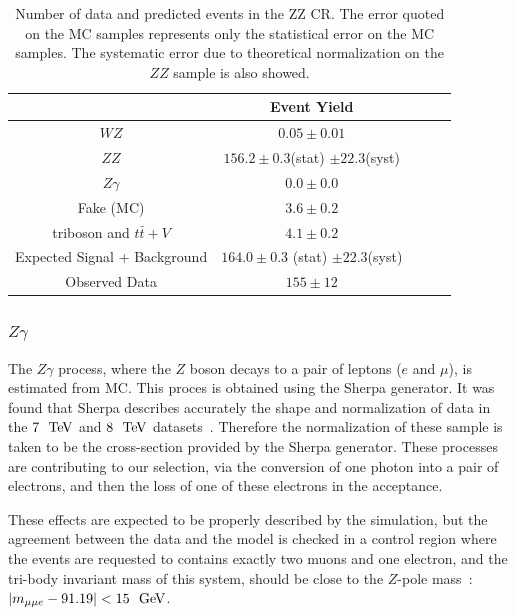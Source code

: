 \begin{table}[htp]
\centering
\begin{tabular}{|c||c|c|c|c|}
\hline
 & Event Yield\\ 
\hline\hline
$WZ$ &  $0.05 \pm 0.01$\\ 
$ZZ$ &  $156.2 \pm 0.3$(stat) $\pm 22.3$(syst) \\ 
$Z\gamma$ &  $0.0 \pm 0.0$\\ 
Fake (MC) &  $3.6 \pm 0.2$\\ 
triboson and $t\bar{t}+V$ &  $4.1 \pm 0.2$\\ 
\hline
Expected Signal + Background &  $164.0 \pm 0.3$ (stat) $\pm 22.3$(syst)\\ 
\hline
Observed Data &  $155 \pm 12$\\ 
\hline
\end{tabular}
\caption{Number of data and predicted events in the ZZ CR. The error quoted on the MC samples represents only the statistical error on the MC samples. The systematic error due to theoretical normalization on the $ZZ$ sample is also showed.}
\label{tab:ZZ_CR}
\end{table}


\clearpage

\subsubsection{$Z\gamma$}

The $Z\gamma$ process, where the $Z$ boson decays to a pair of leptons ($e$ and $\mu$), is estimated from MC. This proces is obtained using the Sherpa generator. It was found that Sherpa describes accurately the shape and normalization of data in the $7~\TeV$ and $8~\TeV$ datasets~\cite{Aad:2013izg,Auerbach:1631102}. Therefore the normalization of these sample is taken to be the cross-section provided by the Sherpa generator. These processes are contributing to our selection, via the conversion of one photon into a pair of electrons, and then the loss of one of these electrons in the acceptance. 

These effects are expected to be properly described by the simulation, but the agreement between the data and the model is checked in a control region where the events are requested to contains exactly two muons and one electron, and the tri-body invariant mass of this system, should be close to the $Z$-pole mass~\cite{PDG:2014}: $|m_{\mu\mu{}e}-91.19|<15~\GeV$.

